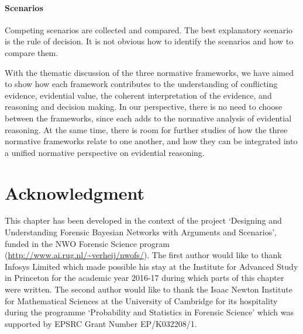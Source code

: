 \documentclass[10pt]{article}
\begin{document}
\paragraph{Scenarios}

Competing scenarios are collected and compared.
The best explanatory scenario is the rule of decision.
It is not obvious how to identify the scenarios and how to compare them.
	

\vspace{1em}
\noindent With the thematic discussion of the three normative frameworks, we have aimed to show how each framework contributes to the understanding of conflicting evidence, evidential value, the coherent interpretation of the evidence, and reasoning and decision making. %
In our perspective, there is no need to choose	 between the frameworks, since each adds to the normative analysis of evidential reasoning. At the same time, there is room for further studies of how the three normative frameworks relate to one another, and how they can be integrated into a unified normative perspective on evidential reasoning.

\section*{Acknowledgment}
This chapter has been developed in the context of the project `Designing and Understanding Forensic Bayesian Networks with Arguments and Scenarios', funded in the NWO Forensic Science program (\url{http://www.ai.rug.nl/~verheij/nwofs/}). The first author would like to thank Infosys 
Limited which made possible his stay at the Institute for Advanced Study in Princeton for the academic year 2016-17 during which parts of this chapter were written. The second author would like to thank the Isaac Newton Institute for Mathematical Sciences at the University of Cambridge for its hospitality during the programme `Probability and Statistics in Forensic Science' which was supported by EPSRC Grant Number EP/K032208/1. 


\newpage

\theendnotes

\newpage

%
	
%

\end{document}
